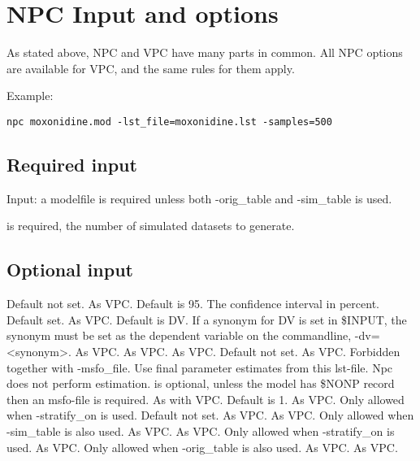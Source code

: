 \section{NPC Input and options}
As stated above, NPC and VPC have many parts in common. All NPC options are available for VPC, and the same rules for them apply.

Example:
\begin{verbatim}
npc moxonidine.mod -lst_file=moxonidine.lst -samples=500 
\end{verbatim}

\subsection{Required input}
Input: a modelfile is required unless both -orig\_table and -sim\_table is used.

\begin{optionlist}
	is required, the number of simulated datasets to generate. 
	\nextopt
\end{optionlist}

\subsection{Optional input}
\begin{optionlist}
	Default not set. As VPC. 
	\nextopt
	Default is 95. The confidence interval in percent. 
	\nextopt
	Default set. As VPC. 
	\nextopt
	Default is DV. If a synonym for DV is set in \$INPUT, the synonym must be set as the dependent variable on the commandline, -dv=<synonym>. 
	\nextopt
	As VPC. 
	\nextopt
	As VPC. 
	\nextopt
	As VPC. 
	\nextopt
	Default not set. As VPC. 
	\nextopt
	Forbidden together with -msfo\_file. Use final parameter estimates from this lst-file. Npc does not perform estimation. 
	\nextopt
	is optional, unless the model has \$NONP record then an msfo-file is required. As with VPC. 
	\nextopt
	Default is 1. As VPC. 
	\nextopt
	Only allowed when -stratify\_on is used. 
	\nextopt
	Default not set. As VPC. 
	\nextopt
	As VPC. 
	\nextopt
	Only allowed when -sim\_table is also used. As VPC. 
	\nextopt
	As VPC.    
	\nextopt
	Only allowed when -stratify\_on is used. 
	\nextopt
	As VPC.    
	\nextopt
	Only allowed when -orig\_table is also used. As VPC. 
	\nextopt
	As VPC.  
	\nextopt
\end{optionlist}

